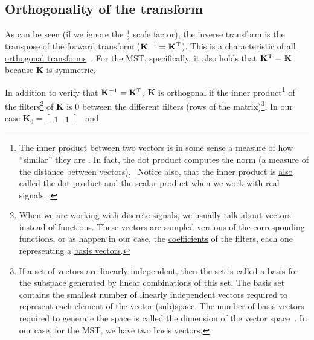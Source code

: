 \subsection{Orthogonality of the transform}
As can be seen (if we ignore the $\frac{1}{2}$ scale factor),
the inverse transform is the transpose of the forward transform
(${\mathbf K}^{-1}={\mathbf K}^{\text T}$). This is a characteristic
of all
\href{https://en.wikipedia.org/wiki/Orthogonal_transformation}{orthogonal
  transforms}~\cite{sayood2017introduction}. For the MST,
specifically, it also holds that ${\mathbf K}^{\text T}={\mathbf K}$
because ${\mathbf K}$ is
\href{https://en.wikipedia.org/wiki/Symmetric_matrix}{symmetric}.

In addition to verify that ${\mathbf K}^{-1}={\mathbf K}^{\text T}$,
${\mathbf K}$ is orthogonal if the
\href{https://en.wikipedia.org/wiki/Inner_product_space}{inner
  product}\footnote{The inner product between two vectors is in some
  sense a measure of how ``similar'' they are
  \cite{sayood2017introduction}. In fact, the dot product computes the
  norm (a measure of the distance between
  vectors).~\cite{vetterli2014foundations} Notice also, that the inner
  product is
  \href{https://math.stackexchange.com/questions/476738/difference-between-dot-product-and-inner-product}{also
    called} the \href{https://en.wikipedia.org/wiki/Dot_product}{dot
    product} and the scalar product when we work with
  \href{https://en.wikipedia.org/wiki/Real_number}{real}
  signals.~\cite{vetterli2014foundations}} of the
filters\footnote{When we are working with discrete signals, we usually
  talk about vectors instead of functions. These vectors are sampled
  versions of the corresponding functions, or as happen in our case,
  the
  \href{https://en.wikipedia.org/wiki/Finite_impulse_response}{coefficients}
  of the filters, each one representing a
  \href{https://en.wikipedia.org/wiki/Basis_(linear_algebra)}{basis
    vectors}.} of ${\mathbf K}$ is $0$ between the different filters
(rows of the matrix)\footnote{If a set of vectors are linearly
  independent, then the set is called a basis for the subspace
  generated by linear combinations of this set. The basis set contains
  the smallest number of linearly independent vectors required to
  represent each element of the vector (sub)space. The number of basis
  vectors required to generate the space is called the dimension of
  the vector space~\cite{sayood2017introduction}. In our case, for the
  MST, we have two basis vectors.}. In our case
${\mathbf K}_0=\begin{bmatrix}1 & 1\end{bmatrix}$~ and
